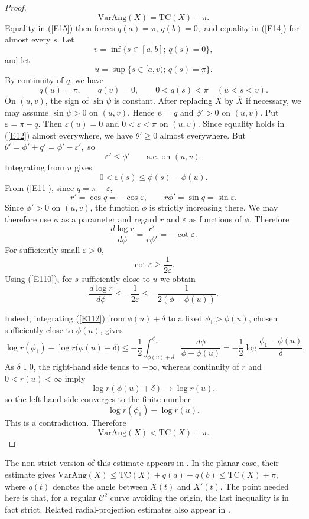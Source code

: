 \documentclass[reqno]{amsart}
\theoremstyle{definition}
\newcommand{\T}{\mathrm{TC}}
\newcommand{\VA}{\mathrm{VarAng}}
\newcommand{\cC}{\mathcal{C}}
\def\bar{\overline}
\numberwithin{equation}{section}
\begin{document}
\begin{proof}
\begin{equation}\VA(X)=\T(X)+\pi.
\label{E16}
\end{equation}
Equality in (\ref{E15}) then forces $q(a)=\pi,\,q(b)=0,$
and equality in (\ref{E14}) for almost every $s$. Let
\[v=\inf\{s\in[a,b];\,q(s)=0\},\]
and let
\[u=\sup\{s\in[a,v);\,q(s)=\pi\}.
\]
By continuity of $q$, we have
\begin{equation*} q(u)=\pi,\qquad q(v)=0,\qquad 0<q(s)<\pi \quad (u<s<v).
\end{equation*}
On $(u,v)$, the sign of $\sin\psi$ is constant. After replacing $X$ by $\bar X$ if necessary, we may assume $\sin\psi>0$ on $(u,v)$. Hence $\psi=q$ and $ \phi'>0$ on $(u,v).$ Put $\varepsilon=\pi-q$.
Then $\varepsilon(u)=0$ and  $0<\varepsilon<\pi$ on $(u,v).$
Since equality holds in (\ref{E12}) almost everywhere, we have $\theta'\ge0 $ almost everywhere. But $\theta'=\phi'+q'=\phi'-\varepsilon',$
so
\begin{equation*}
	\varepsilon'\le \phi'\qquad\text{a.e. on }(u,v).
\end{equation*}
Integrating from $u$ gives
\begin{equation}0<\varepsilon(s)\le\phi(s)-\phi(u).
    \label{E110}
\end{equation}
From (\ref{E11}), since $q=\pi-\varepsilon$,
\[r'=\cos q=-\cos\varepsilon,\qquad r\phi'=\sin q=\sin\varepsilon.\]
Since $\phi'>0$ on $(u,v)$, the function $\phi$ is strictly increasing
there. We may therefore use $\phi$ as a parameter and regard $r$ and
$\varepsilon$ as functions of $\phi$. Therefore
\begin{equation}\frac{d\log r}{d\phi}=\frac{r'}{r\phi'}=-\cot\varepsilon.
    \label{E111}
\end{equation}
For sufficiently small $\varepsilon>0$,
\[\cot\varepsilon\ge \frac{1}{2\varepsilon}.\]
Using (\ref{E110}), for $s$ sufficiently close to $u$ we obtain
\begin{equation}\frac{d\log r}{d\phi}\le-\frac{1}{2\varepsilon}\le-\frac{1}{2\left(\phi-\phi(u)\right)}.
    \label{E112}
\end{equation}

Indeed, integrating (\ref{E112}) from $\phi(u)+\delta$ to a fixed
$\phi_1>\phi(u)$, chosen sufficiently close to $\phi(u)$, gives
\[
\log r(\phi_1)-\log r\bigl(\phi(u)+\delta\bigr)
\le
-\frac12
\int_{\phi(u)+\delta}^{\phi_1}
\frac{d\phi}{\phi-\phi(u)}
=
-\frac12
\log\frac{\phi_1-\phi(u)}{\delta}.
\]
As $\delta\downarrow0$, the right-hand side tends to $-\infty$,
whereas continuity of $r$ and $0<r(u)<\infty$ imply
\[
\log r\left(\phi(u)+\delta\right)\longrightarrow \log r(u),
\]
so the left-hand side converges to the finite number
\[\log r(\phi_1)-\log r(u).\]
This is a contradiction. Therefore
\[\VA(X)<\T(X)+\pi.\]
\end{proof}
The non-strict version of this estimate appears in \cite[Theorem~4]{KY}. In the planar case, their estimate gives $\VA(X)\le \T(X)+q(a)-q(b)\le \T(X)+\pi,$ where $q(t)$ denotes the angle between $X(t)$ and $X'(t)$. The point needed here is that, for a regular $\cC^2$ curve avoiding the origin, the last inequality is in fact strict. Related radial-projection estimates also appear in \cite[Section~8]{EWW}.
\end{document}
